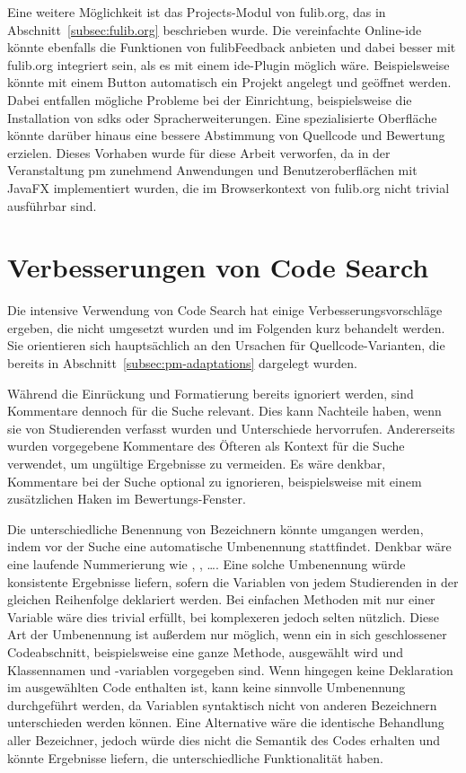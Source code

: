 Eine weitere Möglichkeit ist das Projects-Modul von fulib.org, das in Abschnitt~\ref{subsec:fulib.org} beschrieben wurde.
Die vereinfachte Online-\ac{ide} könnte ebenfalls die Funktionen von fulibFeedback anbieten und dabei besser mit fulib.org integriert sein, als es mit einem \ac{ide}-Plugin möglich wäre.
Beispielsweise könnte mit einem Button automatisch ein Projekt angelegt und geöffnet werden.
Dabei entfallen mögliche Probleme bei der Einrichtung, beispielsweise die Installation von \acp{sdk} oder Spracherweiterungen.
Eine spezialisierte Oberfläche könnte darüber hinaus eine bessere Abstimmung von Quellcode und Bewertung erzielen.
Dieses Vorhaben wurde für diese Arbeit verworfen, da in der Veranstaltung \ac{pm} zunehmend Anwendungen und Benutzeroberflächen mit JavaFX implementiert wurden, die im Browserkontext von fulib.org nicht trivial ausführbar sind.

\section{Verbesserungen von Code Search}\label{sec:code-search-improvements}

Die intensive Verwendung von Code Search hat einige Verbesserungsvorschläge ergeben, die nicht umgesetzt wurden und im Folgenden kurz behandelt werden.
Sie orientieren sich hauptsächlich an den Ursachen für Quellcode-Varianten, die bereits in Abschnitt~\ref{subsec:pm-adaptations} dargelegt wurden.

Während die Einrückung und Formatierung bereits ignoriert werden, sind Kommentare dennoch für die Suche relevant.
Dies kann Nachteile haben, wenn sie von Studierenden verfasst wurden und Unterschiede hervorrufen.
Andererseits wurden vorgegebene Kommentare des Öfteren als Kontext für die Suche verwendet, um ungültige Ergebnisse zu vermeiden.
Es wäre denkbar, Kommentare bei der Suche optional zu ignorieren, beispielsweise mit einem zusätzlichen Haken im Bewertungs-Fenster.

Die unterschiedliche Benennung von Bezeichnern könnte umgangen werden, indem vor der Suche eine automatische Umbenennung stattfindet.
Denkbar wäre eine laufende Nummerierung wie , , \ldots.
Eine solche Umbenennung würde konsistente Ergebnisse liefern, sofern die Variablen von jedem Studierenden in der gleichen Reihenfolge deklariert werden.
Bei einfachen Methoden mit nur einer Variable wäre dies trivial erfüllt, bei komplexeren jedoch selten nützlich.
Diese Art der Umbenennung ist außerdem nur möglich, wenn ein in sich geschlossener Codeabschnitt, beispielsweise eine ganze Methode, ausgewählt wird und Klassennamen und -variablen vorgegeben sind.
Wenn hingegen keine Deklaration im ausgewählten Code enthalten ist, kann keine sinnvolle Umbenennung durchgeführt werden, da Variablen syntaktisch nicht von anderen Bezeichnern unterschieden werden können.
Eine Alternative wäre die identische Behandlung aller Bezeichner, jedoch würde dies nicht die Semantik des Codes erhalten und könnte Ergebnisse liefern, die unterschiedliche Funktionalität haben.

